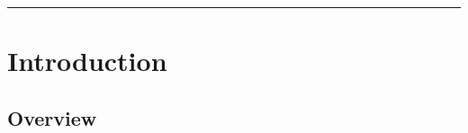 \documentclass[letterpaper]{book}
\begin{document}
\doparttoc


\frontmatter







\title{\FiPy{}}
\subtitle{A Finite Volume PDE Solver Using Python}

\author{Daniel Wheeler \and Jonathan E. Guyer \and James A. Warren}

\maketitle

\vspace*{\fill}



\rule{\textwidth}{1pt}



\tableofcontents

\mainmatter


\part{Introduction}


\parttoc


\chapter{Overview}
\end{document}
